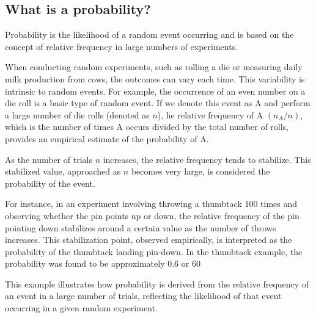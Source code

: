 \documentclass{article}
\begin{document}
\subsection{What is a probability?}

Probability is the likelihood of a random event occurring and is based on the concept of relative frequency in large numbers of experiments.

When conducting random experiments, such as rolling a die or measuring daily milk production from cows, the outcomes can vary each time. This variability is intrinsic to random events. For example, the occurrence of an even number on a die roll is a basic type of random event. If we denote this event as A and perform a large number of die rolls (denoted as $n$), he relative frequency of A $(n_A/n)$, which is the number of times A occurs divided by the total number of rolls, provides an empirical estimate of the probability of A.

As the number of trials $n$ increases, the relative frequency tends to stabilize. This stabilized value, approached as $n$ becomes very large, is considered the probability of the event.

For instance, in an experiment involving throwing a thumbtack 100 times and observing whether the pin points up or down, the relative frequency of the pin pointing down stabilizes around a certain value as the number of throws increases. This stabilization point, observed empirically, is interpreted as the probability of the thumbtack landing pin-down. In the thumbtack example, the probability was found to be approximately 0.6 or 60%

This example illustrates how probability is derived from the relative frequency of an event in a large number of trials, reflecting the likelihood of that event occurring in a given random experiment.
\end{document}
